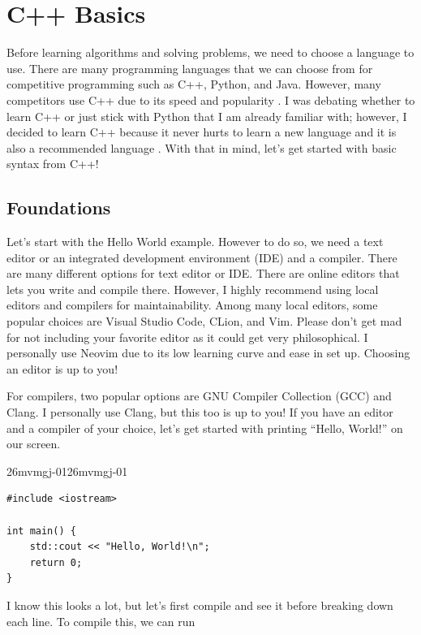 \documentclass[../../../main.tex]{subfiles}
\begin{document}
\chapter{C++ Basics}

Before learning algorithms and solving problems, we need to choose
a language to use. There are many programming languages that we can
choose from for competitive programming such as C++, Python, and Java.
However, many competitors use C++ due to its speed and popularity
\cite{CS02-2}. I was debating whether to learn C++ or just stick with
Python that I am already familiar with; however, I decided to learn
C++ because it never hurts to learn a new language and it is also a
recommended language \cite{CS02-3}. With that in mind, let's get
started with basic syntax from C++!

\section{Foundations}

Let's start with the Hello World example. However to do so, we need
a text editor or an integrated development environment (IDE) and a
compiler. There are many different options for text editor or IDE.
There are online editors that lets you write and compile there.
However, I highly recommend using local editors and compilers for
maintainability. Among many local editors, some popular choices
are Visual Studio Code, CLion, and Vim. Please don't get mad for not
including your favorite editor as it could get very philosophical.
I personally use Neovim due to its low learning curve and ease in
set up. Choosing an editor is up to you!

For compilers, two popular options are GNU Compiler Collection (GCC)
and Clang. I personally use Clang, but this too is up to you!
If you have an editor and a compiler of your choice, let's get
started with printing ``Hello, World!'' on our screen.

\begin{cppbox}{26mvmgj-01}{26mvmgj-01}
\begin{lstlisting}[style=cppstyle]
#include <iostream>

int main() {
    std::cout << "Hello, World!\n";
    return 0;
}
\end{lstlisting}
\end{cppbox}

I know this looks a lot, but let's first compile and see it before
breaking down each line. To compile this, we can run
\end{document}
